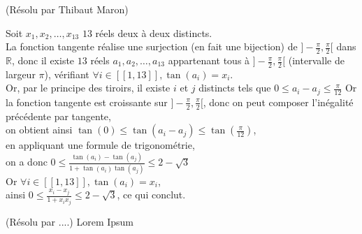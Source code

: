 \begin{sol}[130](Résolu par Thibaut Maron)

Soit $x_1,x_2,\dots,x_{13}$ $13$ r\'eels deux \`a deux distincts.\\
La fonction tangente réalise une surjection (en fait une bijection) de $]-\frac{\pi}{2},\frac{\pi}{2}[$ dans $\mathbb{R}$, donc il existe $13$ réels $a_1,a_2,\dots,a_{13}$ appartenant tous \`a $]-\frac{\pi}{2},\frac{\pi}{2}[$ (intervalle de largeur $\pi$),
vérifiant $\forall i \in [[1,13]], \tan(a_i)=x_i$. \\
Or, par le principe des tiroirs, il existe $i$ et $j$ distincts tels que $ 0 \leq a_i-a_j \leq \frac{\pi}{12}$
Or la fonction tangente est croissante sur $]-\frac{\pi}{2},\frac{\pi}{2}[$, donc on peut composer l'in\'egalit\'e pr\'ec\'edente par tangente, \\
on obtient ainsi $\tan(0) \leq \tan(a_i-a_j) \leq \tan(\frac{\pi}{12})$, \\
en appliquant une formule de trigonométrie, \\
on a donc $0 \leq \frac{\tan(a_i)-\tan(a_j)}{1+\tan(a_i)\tan(a_j)} \leq 2-\sqrt{3} $ \\
Or $\forall i \in [[1,13]], \tan(a_i)=x_i$, \\
ainsi $0 \leq \frac{x_i-x_j}{1+x_i x_j} \leq 2-\sqrt{3}$,
ce qui conclut.

\end{sol}

\begin{sol}[1](Résolu par ....)
Lorem Ipsum
\end{sol}

